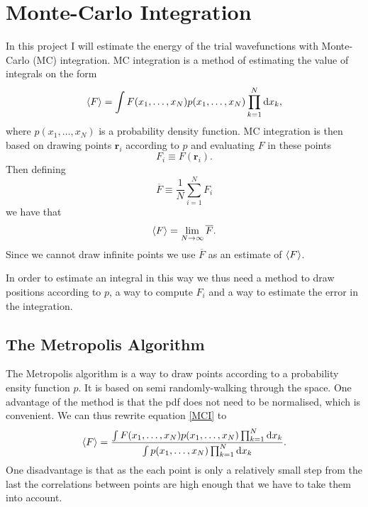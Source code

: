 \documentclass[a4paper,English,10pt]{article}
\newcommand{\bb}[1]{\boldsymbol{#1}}
\newcommand{\dd}{\mathrm{d}}
\newcommand{\rar}{\rightarrow}
\newcommand{\be}{\begin{equation}}
\newcommand{\ee}{\end{equation}}
\newcommand{\f}{\frac}
\renewcommand{\bar}{\overline}
\renewcommand{\braket}{\Braket}
\begin{document}
\section{Monte-Carlo Integration}

In this project I will estimate the energy of the trial wavefunctions with Monte-Carlo (MC) integration.
MC integration is a method of estimating the value of integrals on the form
\be
\braket{F} = \int F(x_1,\ldots,x_N)p(x_1,\ldots,x_N)\prod_{k=1}^N\dd x_k, \label{MCI}
\ee
where \(p(x_1,\ldots,x_N)\) is a probability density function.
MC integration is then based on drawing points $\bb{r}_i$ according to $p$ and evaluating $F$ in these points
\be
F_i \equiv F(\bb{r}_i).
\ee
Then defining
\be
\bar{F} \equiv \f{1}{N}\sum_{i=1}^N F_i
\ee
we have that
\be
\braket{F} = \lim_{N\rar\infty}\bar{F}.
\ee
Since we cannot draw infinite points we use $\bar{F}$ as an estimate of $\braket{F}$.

In order to estimate an integral in this way we thus need a method to draw positions according to $p$,
a way to compute $F_i$ and a way to estimate the error in the integration.





\subsection{The Metropolis Algorithm}

The Metropolis algorithm is a way to draw points according to a probability ensity function $p$. It is based on semi randomly-walking through
the space. One advantage of the method is that the pdf does not need to be normalised, which is convenient.
We can thus rewrite equation \ref{MCI} to
\be
\braket{F} = \f{\int F(x_1,\ldots,x_N)p(x_1,\ldots,x_N)\prod_{k=1}^N\dd x_k}{\int p(x_1,\ldots,x_N)\prod_{k=1}^N\dd x_k}. \label{exp}
\ee
One disadvantage is that
as the each point is only a relatively small step from the last the correlations between points are high enough that we have to take them into account.
\end{document}
